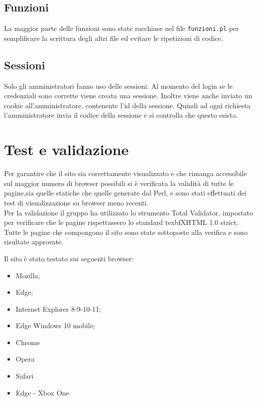 \documentclass{article}
\begin{document}
	\subsection{Funzioni}
		La maggior parte delle funzioni sono state racchiuse nel file \texttt{funzioni.pl} per semplificare la scrittura degli 
		altri file ed evitare le ripetizioni di codice.
	\subsection{Sessioni}
		Solo gli amministratori fanno uso delle sessioni. Al momento del login se le credenziali sono corrette viene creata una
		sessione. Inoltre viene anche inviato un cookie all'amministratore, contenente l'id della sessione. Quindi ad ogni
		richiesta l'amministratore invia il codice della sessione e si controlla che questo esista.


\section{Test e validazione}

	Per garantire che il sito sia correttamente visualizzato e che rimanga accessibile sul maggior numero di browser possibili 
	si è verificata la validità di tutte le pagine,sia quelle statiche che quelle generate dal Perl, e sono stati effettuati 
	dei test di visualizzazione su browser meno recenti. \\
	Per la validazione il gruppo ha utilizzato lo strumento Total Validator, impostato per verificare che le pagine rispettassero
	lo standard texbf{XHTML 1.0 strict}. Tutte le pagine che compongono il sito sono state sottoposte alla verifica e sono 
	risultate approvate.
	
	Il sito è stato testato sui seguenti browser:
	\begin{itemize}
		\item Mozilla; 
		\item Edge;
		\item Internet Explorer 8-9-10-11;
		\item Edge Windows 10 mobile;
		\item Chrome
		\item Opera
		\item Safari
		\item Edge - Xbox One
	\end{itemize}
	
\end{document}
